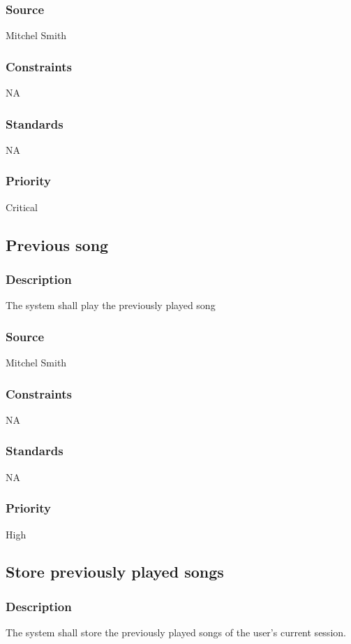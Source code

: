 \subsubsection{Source}
Mitchel Smith
\subsubsection{Constraints}
NA
\subsubsection{Standards}
NA
\subsubsection{Priority}
Critical




\subsection{Previous song}
\subsubsection{Description}
The system shall play the previously played song
\subsubsection{Source}
Mitchel Smith
\subsubsection{Constraints}
NA
\subsubsection{Standards}
NA
\subsubsection{Priority}
High




\subsection{Store previously played songs}
\subsubsection{Description}
The system shall store the previously played songs of the user's current session.
